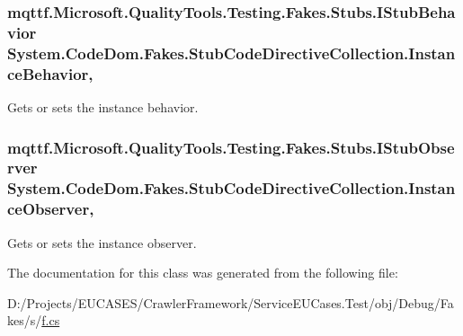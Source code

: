 \hypertarget{class_system_1_1_code_dom_1_1_fakes_1_1_stub_code_directive_collection_a79686d9475323862e258c180c1ccbbbd}{
\subsubsection[{Instance\-Behavior}]{\setlength{\rightskip}{0pt plus 5cm}mqttf.\-Microsoft.\-Quality\-Tools.\-Testing.\-Fakes.\-Stubs.\-I\-Stub\-Behavior System.\-Code\-Dom.\-Fakes.\-Stub\-Code\-Directive\-Collection.\-Instance\-Behavior\hspace{0.3cm}{\ttfamily [get]}, {\ttfamily [set]}}}\label{class_system_1_1_code_dom_1_1_fakes_1_1_stub_code_directive_collection_a79686d9475323862e258c180c1ccbbbd}


Gets or sets the instance behavior.

\hypertarget{class_system_1_1_code_dom_1_1_fakes_1_1_stub_code_directive_collection_abfe2f3215620240509c31c9f3520b5be}{
\subsubsection[{Instance\-Observer}]{\setlength{\rightskip}{0pt plus 5cm}mqttf.\-Microsoft.\-Quality\-Tools.\-Testing.\-Fakes.\-Stubs.\-I\-Stub\-Observer System.\-Code\-Dom.\-Fakes.\-Stub\-Code\-Directive\-Collection.\-Instance\-Observer\hspace{0.3cm}{\ttfamily [get]}, {\ttfamily [set]}}}\label{class_system_1_1_code_dom_1_1_fakes_1_1_stub_code_directive_collection_abfe2f3215620240509c31c9f3520b5be}


Gets or sets the instance observer.



The documentation for this class was generated from the following file\-:\begin{DoxyCompactItemize}
\item 
D\-:/\-Projects/\-E\-U\-C\-A\-S\-E\-S/\-Crawler\-Framework/\-Service\-E\-U\-Cases.\-Test/obj/\-Debug/\-Fakes/s/\hyperlink{s_2f_8cs}{f.\-cs}\end{DoxyCompactItemize}
